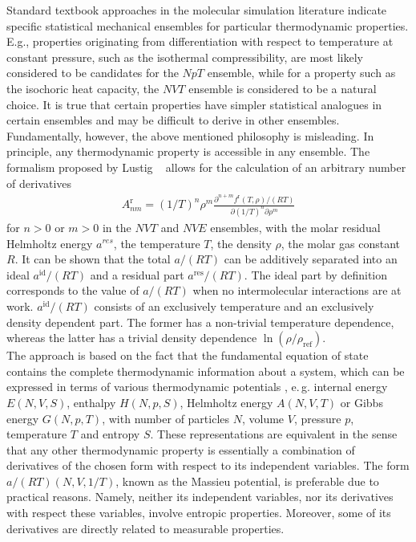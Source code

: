 Standard textbook approaches in the molecular simulation literature indicate specific statistical mechanical ensembles for particular thermodynamic properties. E.g., properties originating from differentiation with respect to temperature at constant pressure, such as the isothermal compressibility, are most likely considered to be candidates for the $NpT$ ensemble, while for a property such as the isochoric heat capacity, the $NVT$ ensemble is considered to be a natural choice. It is true that certain properties have simpler statistical analogues in certain ensembles and may be difficult to derive in other ensembles. Fundamentally, however, the above mentioned philosophy is misleading. In principle, any thermodynamic property is accessible in any ensemble. The formalism proposed by Lustig ~\parencite{Lus11, Lus12} allows for the calculation of an arbitrary number of derivatives
\begin{align} 
A^\mathrm{r}_{nm}=(1/T)^n \rho^m \frac{\partial^{n+m}f^\text{r}(T,\rho)/(RT)}{\partial(1/T)^n \partial \rho^m}
\label{eq:helmholtzderiv}
\end{align}
for $n>0$ or $m>0$ in the $NVT$ and $NVE$ ensembles, with the molar residual Helmholtz energy $a^{res}$, the temperature $T$, the density $\rho$, the molar gas constant $R$. It can be shown that the total $a/(RT)$ can be additively separated into an ideal $a^\text{id}/(RT)$ and a residual part $a^\text{res}/(RT)$. The ideal part by definition corresponds to the value of $a/(RT)$ when no intermolecular interactions are at work. %
$a^\text{id}/(RT)$ consists of an exclusively temperature and an exclusively density dependent part. The former has a  non-trivial temperature dependence, whereas the latter has a trivial density dependence $\ln(\rho/\rho_\text{ref})$.\\
The approach is based on the fact that the fundamental equation of state contains the complete thermodynamic information about a system, which can be expressed in terms of various thermodynamic potentials%
, e.\,g. internal energy $E(N,V,S)$, enthalpy $H(N,p,S)$, Helmholtz energy $A(N,V,T)$ or Gibbs energy $G(N,p,T)$, with number of particles $N$, volume $V$, pressure $p$, temperature $T$ and entropy $S$. These representations are equivalent in the sense that any other thermodynamic property is essentially a combination of derivatives of the chosen form with respect to its independent variables. The form $a/(RT)(N,V,1/T)$, known as the Massieu potential, is preferable due to practical reasons. Namely, neither its independent variables, nor its derivatives with respect these variables, involve entropic properties. Moreover, some of its derivatives are directly related to measurable properties.\\
